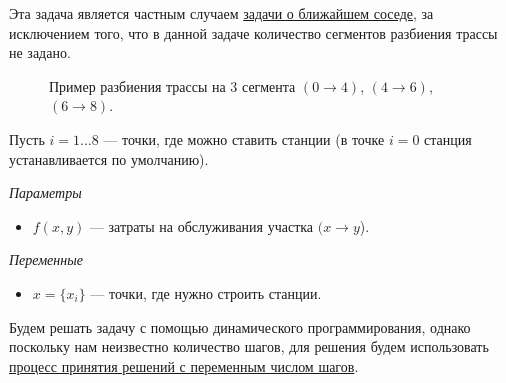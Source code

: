 \mathmodel

Эта задача является частным случаем \hyperref[pr:nearest_neighbor_problem]{задачи о ближайшем соседе}, за исключением того, что в данной задаче количество сегментов разбиения трассы не задано.

\begin{figure}[H]
	\centering
	\caption{Пример разбиения трассы на 3 сегмента $(0 \to 4)$, $(4 \to 6)$, $(6 \to 8)$.}
\end{figure}

Пусть $i = 1 \dots 8$ --- точки, где можно ставить станции (в точке $i=0$ станция устанавливается по умолчанию).

\bigskip

\textit{Параметры}

\begin{itemize}[nosep]
	\item $f(x, y)$ --- затраты на обслуживания участка $(x \to y$).
\end{itemize}

\bigskip

\textit{Переменные}

\begin{itemize}[nosep]	
	\item $x = \{x_i\}$ --- точки, где нужно строить станции.
\end{itemize}

\solution

Будем решать задачу с помощью динамического программирования, однако поскольку нам неизвестно количество шагов, для решения будем использовать \hyperref[alg:unknown_step_process]{процесс принятия решений с переменным числом шагов}.

